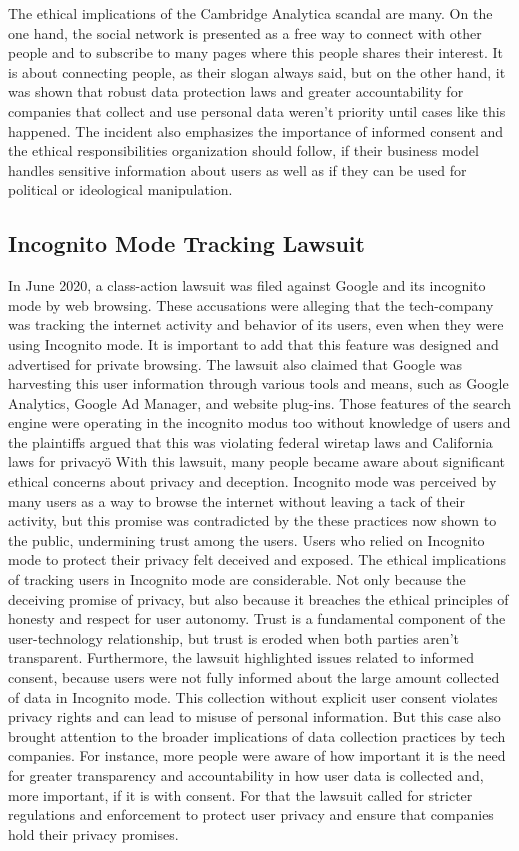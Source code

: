 The ethical implications of the Cambridge Analytica scandal are many.
On the one hand, the social network is presented as a free way to connect with other people and to subscribe to many pages where this people shares their interest.
It is about connecting people, as their slogan always said, but on the other hand, it was shown that robust data protection laws and greater accountability for companies that collect and use personal data weren't priority until cases like this happened.
The incident also emphasizes the importance of informed consent and the ethical responsibilities organization should follow, if their business model handles sensitive information about users as well as if they can be used for political or ideological manipulation.

\subsection{Incognito Mode Tracking Lawsuit}\label{subsec:incognito-mode-tracking-lawsuit}
In June 2020, a class-action lawsuit was filed against Google and its incognito mode by web browsing\cite{Google2020_incognitoData}.
These accusations were alleging that the tech-company was tracking the internet activity and behavior of its users, even when they were using Incognito mode.
It is important to add that this feature was designed and advertised for private browsing.
The lawsuit also claimed that Google was harvesting this user information through various tools and means, such as Google Analytics, Google Ad Manager, and website plug-ins.
Those features of the search engine were operating in the incognito modus too without knowledge of users and the plaintiffs argued that this was violating federal wiretap laws and California laws for privacyö
With this lawsuit, many people became aware about significant ethical concerns about privacy and deception.
Incognito mode was perceived by many users as a way to browse the internet without leaving a tack of their activity, but this promise was contradicted by the these practices now shown to the public, undermining trust among the users.
Users who relied on Incognito mode to protect their privacy felt deceived and exposed.
The ethical implications of tracking users in Incognito mode are considerable.
Not only because the deceiving promise of privacy, but also because it breaches the ethical principles of honesty and respect for user autonomy.
Trust is a fundamental component of the user-technology relationship, but trust is eroded when both parties aren't transparent.
Furthermore, the lawsuit highlighted issues related to informed consent, because users were not fully informed about the large amount collected of data in Incognito mode.
This collection without explicit user consent violates privacy rights and can lead to misuse of personal information.
But this case also brought attention to the broader implications of data collection practices by tech companies.
For instance, more people were aware of how important it is the need for greater transparency and accountability in how user data is collected and, more important, if it is with consent.
For that the lawsuit called for stricter regulations and enforcement to protect user privacy and ensure that companies hold their privacy promises.


